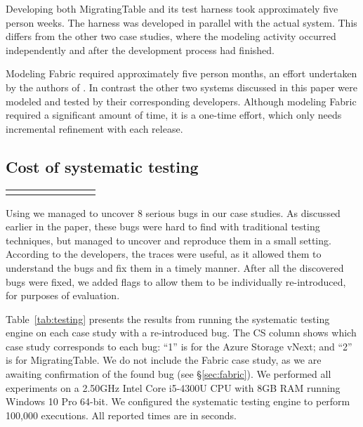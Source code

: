 Developing both MigratingTable and its \psharp test harness took approximately five person weeks. The harness was developed in parallel with the actual system. This differs from the other two case studies, where the modeling activity occurred independently and after the development process had finished.

Modeling Fabric required approximately five person months, an effort undertaken by the authors of \psharp. In contrast the other two systems discussed in this paper were modeled and tested by their corresponding developers. Although modeling Fabric required a significant amount of time, it is a one-time effort, which only needs incremental refinement with each release.

\subsection{Cost of systematic testing}
\label{sec:eval:machine_cost}

\setlength{\tabcolsep}{.68em}
\begin{table*}[t]
\small
\centering
\begin{tabular}{rl rrr rrr}
\centering

\end{tabular}
\caption{Results from running the \psharp random and priority-based systematic testing schedulers for 100,000 executions. We report: time in seconds to find a bug (Time to Bug); number of nondeterministic choices made in the first execution that a bug was found (\#NDC); and if a bug was found (BF?) or not (\cmark\xspace denotes that a bug was found, \smark\xspace denotes that a bug was found only using a custom test harness, and \xmark\xspace denotes that a bug could not be found).}
\label{tab:testing}
\end{table*}

Using \psharp we managed to uncover 8 serious bugs in our case studies. As discussed earlier in the paper, these bugs were hard to find with traditional testing techniques, but \psharp managed to uncover and reproduce them in a small setting. According to the developers, the \psharp traces were useful, as it allowed them to understand the bugs and fix them in a timely manner. After all the discovered bugs were fixed, we added flags to allow them to be individually re-introduced, for purposes of evaluation.

Table~\ref{tab:testing} presents the results from running the \psharp systematic testing engine on each case study with a re-introduced bug. The CS column shows which case study corresponds to each bug: ``1'' is for the Azure Storage vNext; and ``2'' is for MigratingTable. We do not include the Fabric case study, as we are awaiting confirmation of the found bug (see \S\ref{sec:fabric}). We performed all experiments on a 2.50GHz Intel Core i5-4300U CPU with 8GB RAM running Windows 10 Pro 64-bit. We configured the \psharp systematic testing engine to perform 100,000 executions. All reported times are in seconds.

